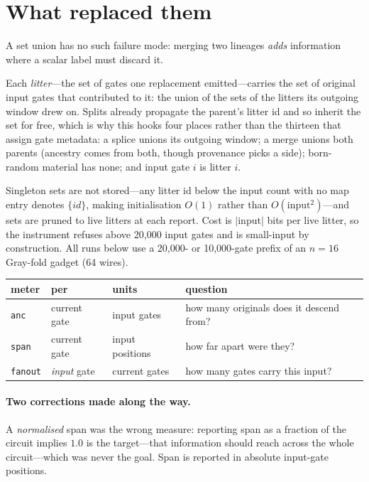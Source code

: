 \documentclass[11pt]{article}
\begin{document}
\section{What replaced them}

A set union has no such failure mode: merging two lineages \emph{adds}
information where a scalar label must discard it.

Each \emph{litter}---the set of gates one replacement emitted---carries the set
of original input gates that contributed to it: the union of the sets of the
litters its outgoing window drew on. Splits already propagate the parent's
litter id and so inherit the set for free, which is why this hooks four places
rather than the thirteen that assign gate metadata: a splice unions its outgoing
window; a merge unions both parents (ancestry comes from both, though provenance
picks a side); born-random material has none; and input gate $i$ is litter $i$.

Singleton sets are not stored---any litter id below the input count with no map
entry denotes $\{id\}$, making initialisation $O(1)$ rather than
$O(\text{input}^2)$---and sets are pruned to live litters at each report. Cost
is $|\text{input}|$ bits per live litter, so the instrument refuses above
20{,}000 input gates and is small-input by construction. All runs below use a
20{,}000- or 10{,}000-gate prefix of an $n=16$ Gray-fold gadget (64 wires).

\begin{center}
\begin{tabular}{llll}
\toprule
meter & per & units & question \\
\midrule
\texttt{anc} & current gate & input gates & how many originals does it descend from? \\
\texttt{span} & current gate & input positions & how far apart were they? \\
\texttt{fanout} & \emph{input} gate & current gates & how many gates carry this input? \\
\bottomrule
\end{tabular}
\end{center}

\paragraph{Two corrections made along the way.}
A \emph{normalised} span was the wrong measure: reporting span as a fraction of
the circuit implies $1.0$ is the target---that information should reach across
the whole circuit---which was never the goal. Span is reported in absolute
input-gate positions.
\end{document}
